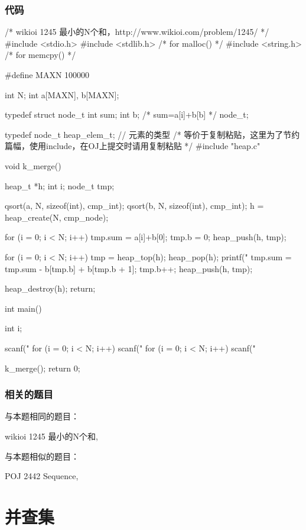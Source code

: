 \subsubsection{代码}
\begin{Codex}[label=sequence.c]
/* wikioi 1245 最小的N个和，http://www.wikioi.com/problem/1245/  */
#include <stdio.h>
#include <stdlib.h>  /* for malloc() */
#include <string.h>  /* for memcpy() */

#define MAXN 100000

int N;
int a[MAXN], b[MAXN];

typedef struct node_t {
    int sum;
    int b; /* sum=a[i]+b[b] */
} node_t;

typedef node_t heap_elem_t; // 元素的类型
/* 等价于复制粘贴，这里为了节约篇幅，使用include，在OJ上提交时请用复制粘贴 */
#include "heap.c"

void k_merge() {
    heap_t *h;
    int i;
    node_t tmp;

    qsort(a, N, sizeof(int), cmp_int);
    qsort(b, N, sizeof(int), cmp_int);
    h = heap_create(N, cmp_node);

    for (i = 0; i < N; i++) {
        tmp.sum = a[i]+b[0];
        tmp.b = 0;
        heap_push(h, tmp);
    }

    for (i = 0; i < N; i++) {
        tmp = heap_top(h); heap_pop(h);
        printf("%
        tmp.sum = tmp.sum - b[tmp.b] + b[tmp.b + 1];
        tmp.b++;
        heap_push(h, tmp);
    }

    heap_destroy(h);
    return;
}

int main() {
    int i;

    scanf("%
    for (i = 0; i < N; i++) {
        scanf("%
    }
    for (i = 0; i < N; i++) {
        scanf("%
    }

    k_merge();
    return 0;
}
\end{Codex}

\subsubsection{相关的题目}
与本题相同的题目：
\begindot
\item wikioi 1245 最小的N个和, 
\myenddot

与本题相似的题目：
\begindot
\item  POJ 2442 Sequence, 
\myenddot


\section{并查集} %

